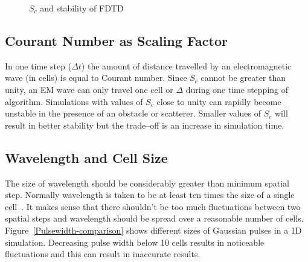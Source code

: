 \begin{figure}[htb]
\centering
\mbox{\quad{}}
\caption{$S_c$ and stability of FDTD}
\label{Unstable-FDTD}
\end{figure}
\subsection{Courant Number as Scaling Factor}
In one time step ($\Delta t$) the amount of distance travelled by an electromagnetic wave (in cells) is equal to Courant number. Since $S_c$ cannot be greater than unity, an EM wave can only travel one cell or $\Delta$ during one time stepping of algorithm. Simulations with values of $S_c$ close to unity can rapidly become unstable in the presence of an obstacle or scatterer. Smaller values of $S_c$ will result in better stability but the trade--off is an increase in simulation time.
\subsection{Wavelength and Cell Size}
The size of wavelength should be considerably greater than minimum spatial step. Normally wavelength is taken to be at least ten times the size of a single cell~\cite{Taflove2000}. It makes sense that there shouldn't be too much fluctuations between two spatial steps and wavelength should be spread over a reasonable number of cells. Figure~\ref{Pulsewidth-comparison} shows different sizes of Gaussian pulses in a 1D simulation. Decreasing pulse width below 10 cells results in noticeable fluctuations and this can result in inaccurate results.
\begin{figure}[htb]
\centering
{}
\end{figure}
